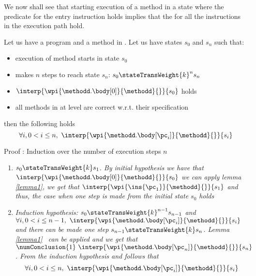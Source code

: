 \Qed

We now shall see that starting execution of a method in a state where the \fwpi{}
 predicate for the entry instruction holds implies that the  
\fwpi{} for all the instructions in the execution path hold. 

\begin{lemma}\label{lemma3}
Let us have a program \Program{} and a method \methodd{} in \Program.
 Let us have states  $s_{0}$ and $s_n$ such that: 
\begin{itemize} 
     \item execution of method  \methodd{} starts  in state $s_{0}$ 
     \item  makes $n$ steps to reach state $s_n$: $s_{0} \stateTransWeight{k}^{n} s_{n} $
     \item $\interp{ \wpi{\methodd.\body[0] } {\methodd}{}}{ s_{0}}$ holds
     \item all methods in \Program{} at level  are correct w.r.t. their specification
\end{itemize}  
 then the following holds
$$\forall i,  0 < i \le n, \  \interp{ \wpi{\methodd.\body[\pc_i] } {\methodd}{ }}{ s_{i}} $$

\end{lemma}
Proof : Induction over the number of execution steps $n$
\begin{enumerate}
    \item\textit{ $s_{0} \stateTransWeight{k} s_{1}$. By initial hypothesis we have that  $\interp{ \wpi{\methodd.\body[0] } {\methodd}{}}{ s_{0}}$
             we can apply lemma \ref{lemma1}, we get that 
             $\interp{ \wpi{\ins{\pc_{1}}}{\methodd}{  } } { s_{1} }  $ and thus, the  case when one step is made from the initial state
             $s_0$  holds}   
    \item \textit{Induction hypothesis:   $s_{0} \stateTransWeight{k}^{n - 1} s_{n - 1}$ and \\
           $\forall i,  0 < i \le n - 1, \  \interp{ \wpi{\methodd.\body[\pc_i] } {\methodd}{}}{ s_{i}} $
           and there can be made one step $s_{n- 1} \stateTransWeight{k} s_n$.  Lemma \ref{lemma1} \ can be applied and we get that
           $\numConclusion{1} \ \interp{ \wpi{\methodd.\body[\pc_n] } {\methodd}{ } }{ s_{n}} $. 
	   From the induction hypothesis and  follows that 
	   $$\forall i,  0 < i \le n, \  \interp{ \wpi{\methodd.\body[\pc_i] } {\methodd}{ }}{ s_{i}} $$ }
\end{enumerate}
\Qed \\

